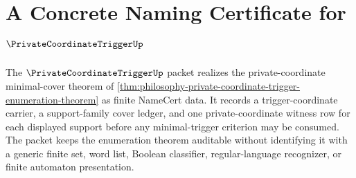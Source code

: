 \chapter{A Concrete Naming Certificate for $\PrivateCoordinateTriggerUp$}
\label{ch:concrete-instances-private-coordinate-trigger-namecert}

The $\PrivateCoordinateTriggerUp$ packet realizes the private-coordinate minimal-cover theorem of \autoref{thm:philosophy-private-coordinate-trigger-enumeration-theorem} as finite NameCert data. It records a trigger-coordinate carrier, a support-family cover ledger, and one private-coordinate witness row for each displayed support before any minimal-trigger criterion may be consumed. The packet keeps the enumeration theorem auditable without identifying it with a generic finite set, word list, Boolean classifier, regular-language recognizer, or finite automaton presentation.



